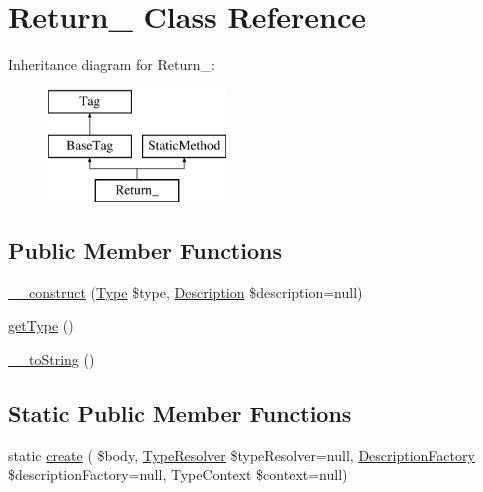 \hypertarget{classphp_documentor_1_1_reflection_1_1_doc_block_1_1_tags_1_1_return__}{}\section{Return\+\_\+ Class Reference}
\label{classphp_documentor_1_1_reflection_1_1_doc_block_1_1_tags_1_1_return__}
Inheritance diagram for Return\+\_\+\+:\begin{figure}[H]
\begin{center}
\leavevmode
\includegraphics[height=3.000000cm]{classphp_documentor_1_1_reflection_1_1_doc_block_1_1_tags_1_1_return__}
\end{center}
\end{figure}
\subsection*{Public Member Functions}
\begin{DoxyCompactItemize}
\item 
\mbox{\hyperlink{classphp_documentor_1_1_reflection_1_1_doc_block_1_1_tags_1_1_return___a80be117d1458096d559ebfcdc0b28978}{\+\_\+\+\_\+construct}} (\mbox{\hyperlink{interfacephp_documentor_1_1_reflection_1_1_type}{Type}} \$type, \mbox{\hyperlink{classphp_documentor_1_1_reflection_1_1_doc_block_1_1_description}{Description}} \$description=null)
\item 
\mbox{\hyperlink{classphp_documentor_1_1_reflection_1_1_doc_block_1_1_tags_1_1_return___a830b5c75df72b32396701bc563fbe3c7}{get\+Type}} ()
\item 
\mbox{\hyperlink{classphp_documentor_1_1_reflection_1_1_doc_block_1_1_tags_1_1_return___a7516ca30af0db3cdbf9a7739b48ce91d}{\+\_\+\+\_\+to\+String}} ()
\end{DoxyCompactItemize}
\subsection*{Static Public Member Functions}
\begin{DoxyCompactItemize}
\item 
static \mbox{\hyperlink{classphp_documentor_1_1_reflection_1_1_doc_block_1_1_tags_1_1_return___a01b1e5c3741d05766720d8cb6d900172}{create}} ( \$body, \mbox{\hyperlink{classphp_documentor_1_1_reflection_1_1_type_resolver}{Type\+Resolver}} \$type\+Resolver=null, \mbox{\hyperlink{classphp_documentor_1_1_reflection_1_1_doc_block_1_1_description_factory}{Description\+Factory}} \$description\+Factory=null, Type\+Context \$context=null)
\end{DoxyCompactItemize}
